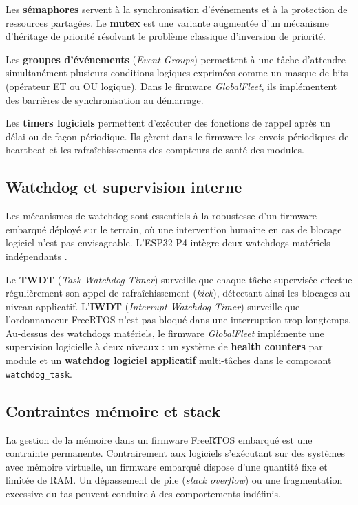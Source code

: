 Les \textbf{sémaphores} servent à la synchronisation d'événements et
à la protection de ressources partagées. Le \textbf{mutex} est une
variante augmentée d'un mécanisme d'héritage de priorité résolvant
le problème classique d'inversion de priorité.

Les \textbf{groupes d'événements} (\textit{Event Groups}) permettent
à une tâche d'attendre simultanément plusieurs conditions logiques
exprimées comme un masque de bits (opérateur ET ou OU logique). Dans
le firmware \textit{GlobalFleet}, ils implémentent des barrières de
synchronisation au démarrage.

Les \textbf{timers logiciels} permettent d'exécuter des fonctions
de rappel après un délai ou de façon périodique. Ils gèrent dans le
firmware les envois périodiques de heartbeat et les rafraîchissements
des compteurs de santé des modules.

\subsection{Watchdog et supervision interne}
\label{subsec:watchdog}

Les mécanismes de watchdog sont essentiels à la robustesse d'un
firmware embarqué déployé sur le terrain, où une intervention humaine
en cas de blocage logiciel n'est pas envisageable. L'ESP32-P4 intègre
deux watchdogs matériels indépendants \cite{espressif_esp32p4}.

Le \textbf{TWDT} (\textit{Task Watchdog Timer}) surveille que chaque
tâche supervisée effectue régulièrement son appel de rafraîchissement
(\textit{kick}), détectant ainsi les blocages au niveau applicatif.
L'\textbf{IWDT} (\textit{Interrupt Watchdog Timer}) surveille que
l'ordonnanceur FreeRTOS n'est pas bloqué dans une interruption trop
longtemps.
\newpage
Au-dessus des watchdogs matériels, le firmware \textit{GlobalFleet}
implémente une supervision logicielle à deux niveaux : un système de
\textbf{health counters} par module et un \textbf{watchdog logiciel
applicatif} multi-tâches dans le composant \texttt{watchdog\_task}.

\subsection{Contraintes mémoire et stack}
\label{subsec:mem_stack}

La gestion de la mémoire dans un firmware FreeRTOS embarqué est une
contrainte permanente. Contrairement aux logiciels s'exécutant sur
des systèmes avec mémoire virtuelle, un firmware embarqué dispose
d'une quantité fixe et limitée de RAM. Un dépassement de pile
(\textit{stack overflow}) ou une fragmentation excessive du tas
peuvent conduire à des comportements indéfinis.

